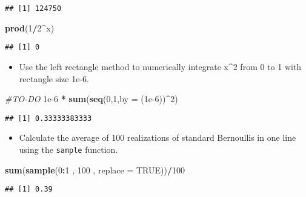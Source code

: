 \documentclass[]{article}
\newenvironment{Shaded}{\begin{snugshade}}{\end{snugshade}}
\newcommand{\KeywordTok}[1]{\textcolor[rgb]{0.13,0.29,0.53}{\textbf{#1}}}
\newcommand{\DataTypeTok}[1]{\textcolor[rgb]{0.13,0.29,0.53}{#1}}
\newcommand{\DecValTok}[1]{\textcolor[rgb]{0.00,0.00,0.81}{#1}}
\newcommand{\FloatTok}[1]{\textcolor[rgb]{0.00,0.00,0.81}{#1}}
\newcommand{\StringTok}[1]{\textcolor[rgb]{0.31,0.60,0.02}{#1}}
\newcommand{\CommentTok}[1]{\textcolor[rgb]{0.56,0.35,0.01}{\textit{#1}}}
\newcommand{\OtherTok}[1]{\textcolor[rgb]{0.56,0.35,0.01}{#1}}
\newcommand{\OperatorTok}[1]{\textcolor[rgb]{0.81,0.36,0.00}{\textbf{#1}}}
\newcommand{\NormalTok}[1]{#1}
\providecommand{\tightlist}{%
  \setlength{\itemsep}{0pt}\setlength{\parskip}{0pt}}
\begin{document}
\begin{verbatim}
## [1] 124750
\end{verbatim}

\begin{Shaded}
\begin{Highlighting}[]
\KeywordTok{prod}\NormalTok{(}\DecValTok{1}\OperatorTok{/}\DecValTok{2}\OperatorTok{^}\NormalTok{x)}
\end{Highlighting}
\end{Shaded}

\begin{verbatim}
## [1] 0
\end{verbatim}

\begin{itemize}
\tightlist
\item
  Use the left rectangle method to numerically integrate x\^{}2 from 0
  to 1 with rectangle size 1e-6.
\end{itemize}

\begin{Shaded}
\begin{Highlighting}[]
\CommentTok{#TO-DO}
\FloatTok{1e-6} \OperatorTok{*}\StringTok{ }\KeywordTok{sum}\NormalTok{(}\KeywordTok{seq}\NormalTok{(}\DecValTok{0}\NormalTok{,}\DecValTok{1}\NormalTok{,}\DataTypeTok{by =}\NormalTok{ (}\FloatTok{1e-6}\NormalTok{))}\OperatorTok{^}\DecValTok{2}\NormalTok{)}
\end{Highlighting}
\end{Shaded}

\begin{verbatim}
## [1] 0.33333383333
\end{verbatim}

\begin{itemize}
\tightlist
\item
  Calculate the average of 100 realizations of standard Bernoullis in
  one line using the \texttt{sample} function.
\end{itemize}

\begin{Shaded}
\begin{Highlighting}[]
\KeywordTok{sum}\NormalTok{(}\KeywordTok{sample}\NormalTok{(}\DecValTok{0}\OperatorTok{:}\DecValTok{1}\NormalTok{ , }\DecValTok{100}\NormalTok{ , }\DataTypeTok{replace =} \OtherTok{TRUE}\NormalTok{))}\OperatorTok{/}\DecValTok{100}
\end{Highlighting}
\end{Shaded}

\begin{verbatim}
## [1] 0.39
\end{verbatim}
\end{document}
